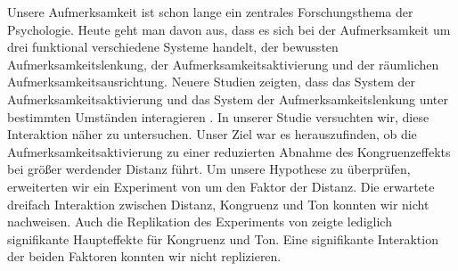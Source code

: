 Unsere Aufmerksamkeit ist schon lange ein zentrales Forschungsthema der Psychologie. Heute geht man davon aus, dass es sich bei der Aufmerksamkeit um drei funktional verschiedene Systeme handelt, der bewussten Aufmerksamkeitslenkung, der Aufmerksamkeitsaktivierung und der räumlichen Aufmerksamkeitsausrichtung.
Neuere Studien zeigten, dass das System der Aufmerksamkeitsaktivierung und das System der Aufmerksamkeitslenkung unter bestimmten Umständen interagieren \cite{weinbach2012relationship}. 
In unserer Studie versuchten wir, diese Interaktion näher zu untersuchen. 
Unser Ziel war es herauszufinden, ob die Aufmerksamkeitsaktivierung zu einer reduzierten Abnahme des Kongruenzeffekts bei größer werdender Distanz führt. 
Um unsere Hypothese zu überprüfen, erweiterten wir ein Experiment von  um den Faktor der Distanz. 
Die erwartete dreifach Interaktion zwischen Distanz, Kongruenz und Ton konnten wir nicht nachweisen. 
Auch die Replikation des Experiments von  zeigte lediglich signifikante Haupteffekte für Kongruenz und Ton. 
Eine signifikante Interaktion der beiden Faktoren konnten wir nicht replizieren. 
